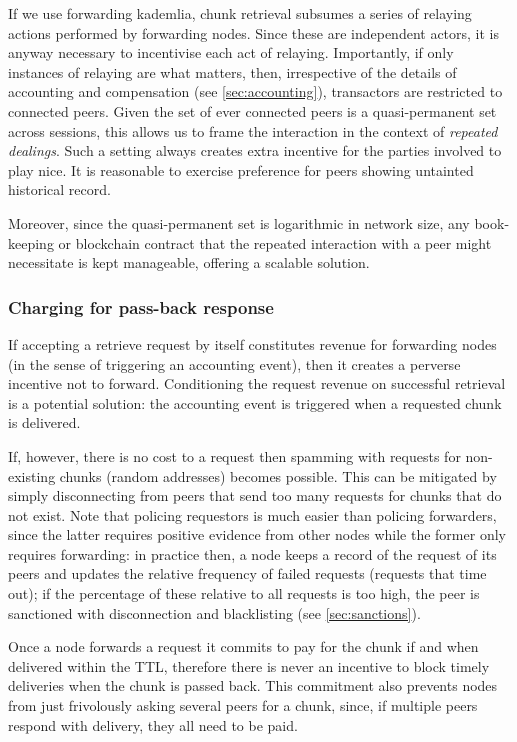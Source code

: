 If we use forwarding kademlia, chunk retrieval subsumes a series of relaying actions performed by forwarding nodes. Since these are independent actors, it is anyway necessary to incentivise each act of relaying. Importantly, if only instances of relaying are what matters, then, irrespective of the details of accounting and compensation (see \ref{sec:accounting}), transactors are restricted to connected peers. Given the set of ever connected peers is a quasi-permanent set across sessions, this allows us to frame the interaction in the context of \emph{repeated dealings}. Such a setting always creates extra incentive for the parties involved to play nice. It is reasonable to exercise preference for peers showing untainted historical record. 

Moreover, since the quasi-permanent set is logarithmic in network size, any book-keeping or blockchain contract that the repeated interaction with a peer might necessitate is kept manageable, offering a scalable solution.

\subsubsection{Charging for pass-back response}

If accepting a retrieve request by itself constitutes revenue for forwarding nodes (in the sense of triggering an accounting event), then it creates a perverse incentive not to forward. Conditioning the request revenue on successful retrieval is a potential solution: the accounting event is triggered when a requested chunk is delivered.

If, however, there is no cost to a request then spamming with requests for non-existing chunks (random addresses) becomes possible. This can be mitigated by simply disconnecting from peers that send too many requests for chunks that do not exist. Note that policing requestors is much easier than policing forwarders, since the latter requires positive evidence from other nodes while the former only requires forwarding: in practice then, a node keeps a record of the request of its peers and updates the relative frequency of failed requests (requests that time out); if the percentage of these relative to all requests is too high, the peer is sanctioned with disconnection and blacklisting (see \ref{sec:sanctions}).

Once a node forwards a request it commits to pay for the chunk if and when delivered within the TTL, therefore there is never an incentive to block timely deliveries when the chunk is passed back.  This commitment also prevents nodes from just frivolously asking several peers for a chunk, since, if  multiple peers respond with delivery, they all need to be paid. 


